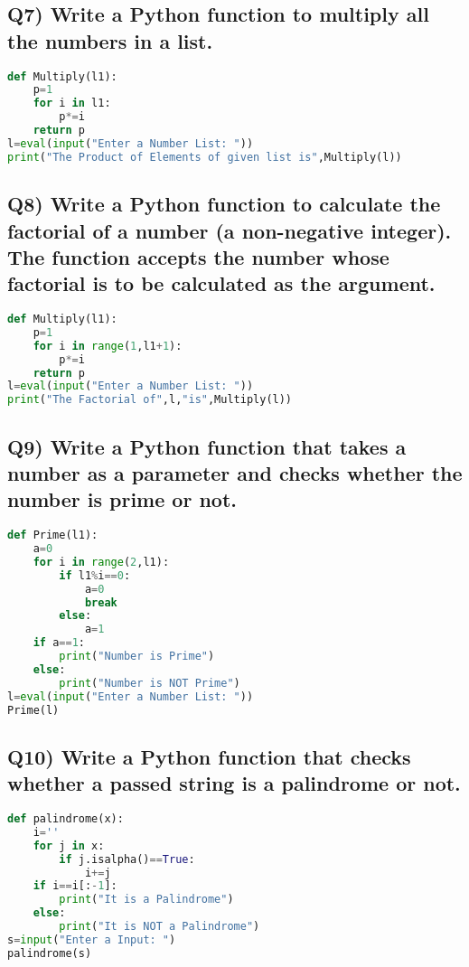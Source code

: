 \documentclass{article}
\begin{document}
\subsection*{Q7) Write a Python function to multiply all the numbers in a list.}
\begin{lstlisting}[language=Python]
def Multiply(l1):
    p=1
    for i in l1:
        p*=i
    return p
l=eval(input("Enter a Number List: "))
print("The Product of Elements of given list is",Multiply(l))
\end{lstlisting}

\subsection*{Q8) Write a Python function to calculate the factorial of a number (a non-negative integer). The function accepts the number whose factorial is to be calculated as the argument.}
\begin{lstlisting}[language=Python]
def Multiply(l1):
    p=1
    for i in range(1,l1+1):
        p*=i
    return p
l=eval(input("Enter a Number List: "))
print("The Factorial of",l,"is",Multiply(l))
\end{lstlisting}

\subsection*{Q9) Write a Python function that takes a number as a parameter and checks whether the number is prime or not.}
\begin{lstlisting}[language=Python]
def Prime(l1):
    a=0
    for i in range(2,l1):
        if l1%i==0:
            a=0
            break
        else:
            a=1
    if a==1:
        print("Number is Prime")
    else:
        print("Number is NOT Prime")
l=eval(input("Enter a Number List: "))
Prime(l)
\end{lstlisting}

\subsection*{Q10) Write a Python function that checks whether a passed string is a palindrome or not.}
\begin{lstlisting}[language=Python]
def palindrome(x):
    i=''
    for j in x:
        if j.isalpha()==True:
            i+=j
    if i==i[:-1]:
        print("It is a Palindrome")
    else:
        print("It is NOT a Palindrome")
s=input("Enter a Input: ")
palindrome(s)
\end{lstlisting}
\end{document}
